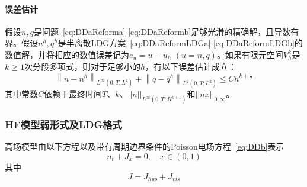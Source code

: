 \paragraph{误差估计}
假设$n, q$是问题~\eqref{eq:DDaReforma}-\eqref{eq:DDaReformb}足够光滑的精确解，且导数有界。假设$n^{h}, q^{h}$是半离散LDG方案~\eqref{eq:DDaReformLDGa}-\eqref{eq:DDaReformLDGb}的数值解，并将相应的数值误差记为$e_{u}=u-u_{h}$ $(u=n, q)$。如果有限元空间$V_{h}^{k}$是$k \geq 1$次分段多项式，则对于足够小的$h$，有以下误差估计成立：
$$
    \left\|n-n^{h}\right\|_{L^{\infty}\left(0, T ; L^{2}\right)}+\left\|q-q^{h}\right\|_{L^{2}\left(0, T ; L^{2}\right)} \leq C h^{k+\frac{1}{2}}
$$
其中常数$C$依赖于最终时间$T$、$k$、$||n||_{L^{\infty}\left(0, T ; H^{k+1}\right)}$和$\left||n{x}\right||_{0, \infty}$。
\subsubsection{HF模型弱形式及LDG格式}
高场模型由以下方程以及带有周期边界条件的Poisson电场方程~\eqref{eq:DDb}表示
\begin{equation}
    n_{t}+J_{x}=0, \quad x \in(0,1) \label{eq:HF}
\end{equation}
其中
$$
    J=J_{h y p}+J_{v i s}
$$

